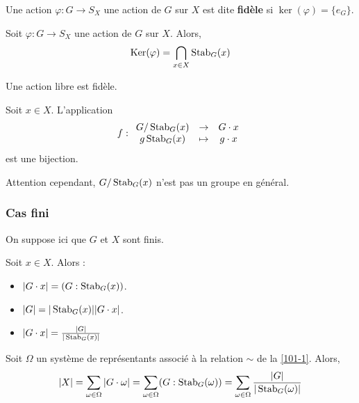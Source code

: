 
	\begin{definition}
		Une action  $\varphi : G \rightarrow S_X$ une action de $G$ sur $X$ est dite \textbf{fidèle} si $\ker(\varphi) = \{ e_G \}$.
	\end{definition}

	\begin{proposition}
		Soit $\varphi : G \rightarrow S_X$ une action de $G$ sur $X$. Alors,
		\[ \mathrm{Ker}(\varphi) = \bigcap_{x \in X} \operatorname{Stab}_G(x) \]
	\end{proposition}

	\begin{corollary}
		Une action libre est fidèle.
	\end{corollary}


	\begin{proposition}
		Soit $x \in X$. L'application
		\[ f :
		\begin{array}{ccc}
			 G/\operatorname{Stab}_G(x) &\rightarrow& G \cdot x \\
			 g \operatorname{Stab}_G(x) &\mapsto& g \cdot x
		\end{array}
		\]
		est une bijection.
	\end{proposition}

	\begin{remark}
		Attention cependant, $G/\operatorname{Stab}_G(x)$ n'est pas un groupe en général.
	\end{remark}

	\subsubsection{Cas fini}

	On suppose ici que $G$ et $X$ sont finis.

	\begin{proposition}
		Soit $x \in X$. Alors :
		\begin{itemize}
			\item $|G \cdot x| = (G : \operatorname{Stab}_G(x))$.
			\item $|G| = |\operatorname{Stab}_G(x)| |G \cdot x|$.
			\item $|G \cdot x| = \frac{|G|}{|\operatorname{Stab}_G(x)|}$
		\end{itemize}
	\end{proposition}

	\begin{theorem}
		Soit $\Omega$ un système de représentants associé à la relation $\sim$ de la \cref{101-1}. Alors,
		\[ |X| = \sum_{\omega \in \Omega} |G \cdot \omega| = \sum_{\omega \in \Omega} (G : \operatorname{Stab}_G(\omega)) = \sum_{\omega \in \Omega} \frac{|G|}{|\operatorname{Stab}_G(\omega)|} \]
	\end{theorem}

